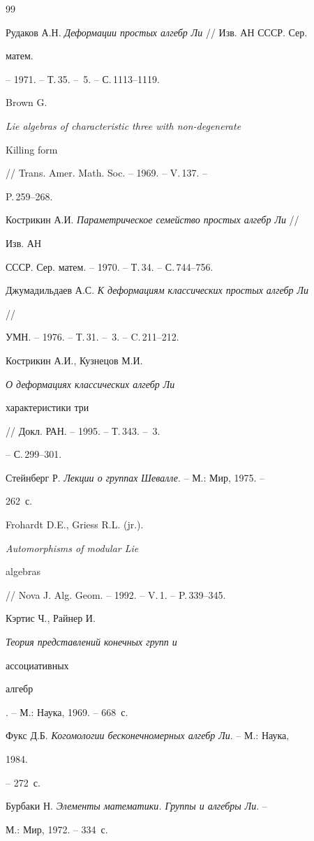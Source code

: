 \begin{thebibliography}{99} 


 




Рудаков А.Н. {\em Деформации простых алгебр Ли} // Изв. АН СССР. Сер. 


матем. 


-- 1971. -- Т.\,35. -- \No\,5. -- С.\,1113--1119. 




Brown G. {\em Lie algebras of characteristic three with non-degenerate 


Killing form} // Trans. Amer. Math. Soc. -- 1969. -- V.\,137. -- 


P.\,259--268. 




Кострикин А.И. {\em Параметрическое семейство простых алгебр Ли} // 


Изв. АН 


СССР. Сер. матем. -- 1970. -- Т.\,34. -- С.\,744--756. 




Джумадильдаев А.С. {\em К деформациям классических простых алгебр Ли} 


// 


УМН. -- 1976. -- Т.\,31. -- \No\,3. -- C.\,211--212. 




Кострикин А.И., Кузнецов М.И. {\em О деформациях классических алгебр Ли 


характеристики три} // Докл. РАН. -- 1995. -- Т.\,343. -- \No\,3. 


-- С.\,299--301. 




Стейнберг Р. {\em Лекции о группах Шевалле}. -- М.: Мир, 1975. -- 


262~с. 




Frohardt D.E., Griess R.L. (jr.). {\em Automorphisms of modular Lie 


algebras} 


// Nova J. Alg. Geom. -- 1992. -- V.\,1. -- P.\,339--345. 




Кэртис Ч., Райнер И. {\em Теория представлений конечных групп и 


ассоциативных 


алгебр}. -- М.: Наука, 1969. -- 668~с. 




Фукс Д.Б. {\em Когомологии бесконечномерных алгебр Ли}. -- М.: Наука, 


1984. 


-- 272~с. 




Бурбаки Н. {\em Элементы математики. Группы и алгебры Ли}. -- 


М.: Мир, 1972. -- 334~с. 


 


\end{thebibliography} 


